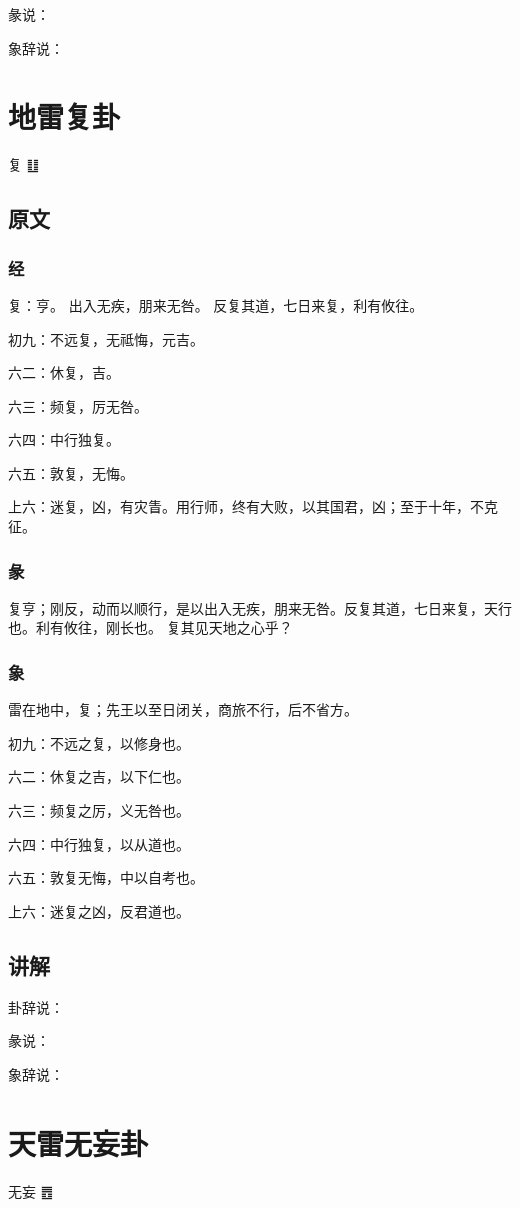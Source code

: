 \documentclass[12pt,oneside]{book}
\begin{document}
彖说：

象辞说：

\chapter{地雷复卦}
复 {\Large ䷗}

\section{原文}
\subsection{经}
复：亨。 出入无疾，朋来无咎。 反复其道，七日来复，利有攸往。

初九：不远复，无祗悔，元吉。

六二：休复，吉。

六三：频复，厉无咎。

六四：中行独复。

六五：敦复，无悔。

上六：迷复，凶，有灾眚。用行师，终有大败，以其国君，凶；至于十年，不克征。

\subsection{彖}
复亨；刚反，动而以顺行，是以出入无疾，朋来无咎。反复其道，七日来复，天行也。利有攸往，刚长也。 复其见天地之心乎？

\subsection{象}
雷在地中，复；先王以至日闭关，商旅不行，后不省方。

初九：不远之复，以修身也。

六二：休复之吉，以下仁也。

六三：频复之厉，义无咎也。

六四：中行独复，以从道也。

六五：敦复无悔，中以自考也。

上六：迷复之凶，反君道也。

\section{讲解}
卦辞说：

彖说：

象辞说：

\chapter{天雷无妄卦}
无妄 {\Large ䷘}
\end{document}
